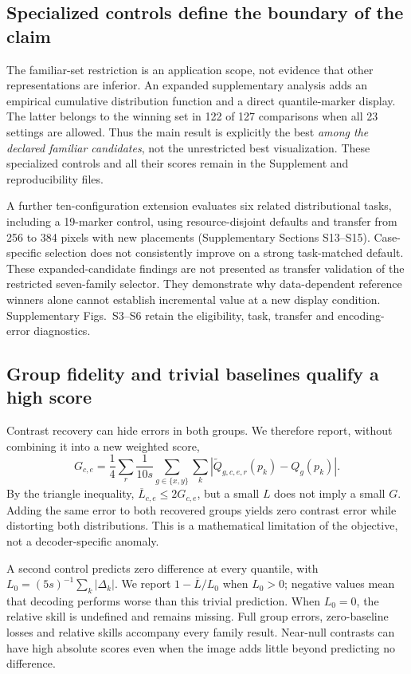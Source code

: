 \documentclass[11pt]{article}
\begin{document}
\subsection*{Specialized controls define the boundary of the claim}
The familiar-set restriction is an application scope, not evidence that other representations are inferior. An expanded supplementary analysis adds an empirical cumulative distribution function and a direct quantile-marker display. The latter belongs to the winning set in 122 of 127 comparisons when all 23 settings are allowed. Thus the main result is explicitly the best \emph{among the declared familiar candidates}, not the unrestricted best visualization. These specialized controls and all their scores remain in the Supplement and reproducibility files.

A further ten-configuration extension evaluates six related distributional tasks, including a 19-marker control, using resource-disjoint defaults and transfer from 256 to 384 pixels with new placements (Supplementary Sections S13--S15). Case-specific selection does not consistently improve on a strong task-matched default. These expanded-candidate findings are not presented as transfer validation of the restricted seven-family selector. They demonstrate why data-dependent reference winners alone cannot establish incremental value at a new display condition. Supplementary Figs.~S3--S6 retain the eligibility, task, transfer and encoding-error diagnostics.

\subsection*{Group fidelity and trivial baselines qualify a high score}
Contrast recovery can hide errors in both groups. We therefore report, without combining it into a new weighted score,
\begin{equation}
G_{c,e}=\frac{1}{4}\sum_r\frac{1}{10s}\sum_{g\in\{x,y\}}\sum_k|\widetilde Q_{g,c,e,r}(p_k)-Q_g(p_k)|.
\end{equation}
By the triangle inequality, $\overline L_{c,e}\leq2G_{c,e}$, but a small $L$ does not imply a small $G$. Adding the same error to both recovered groups yields zero contrast error while distorting both distributions. This is a mathematical limitation of the objective, not a decoder-specific anomaly.

A second control predicts zero difference at every quantile, with $L_0=(5s)^{-1}\sum_k|\Delta_k|$. We report $1-\overline L/L_0$ when $L_0>0$; negative values mean that decoding performs worse than this trivial prediction. When $L_0=0$, the relative skill is undefined and remains missing. Full group errors, zero-baseline losses and relative skills accompany every family result. Near-null contrasts can have high absolute scores even when the image adds little beyond predicting no difference.
\end{document}
